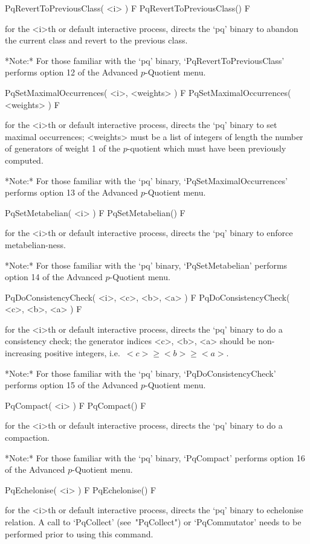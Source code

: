 \>PqRevertToPreviousClass( <i> ) F
\>PqRevertToPreviousClass() F

for the <i>th or default interactive {\ANUPQ} process, directs  the  `pq'
binary to abandon the current class and revert to the previous class.

*Note:*
For  those  familiar  with  the  `pq'  binary,  `PqRevertToPreviousClass'
performs option 12 of the Advanced $p$-Quotient menu.

\>PqSetMaximalOccurrences( <i>, <weights> ) F
\>PqSetMaximalOccurrences( <weights> ) F

for the <i>th or default interactive {\ANUPQ} process, directs  the  `pq'
binary to set maximal occurrences; <weights> must be a list  of  integers
of length the number of generators of weight 1 of the $p$-quotient  which
must have been previously computed.

*Note:* 
For  those  familiar  with  the  `pq'  binary,  `PqSetMaximalOccurrences'
performs option 13 of the Advanced $p$-Quotient menu.

\>PqSetMetabelian( <i> ) F
\>PqSetMetabelian() F

for the <i>th or default interactive {\ANUPQ} process, directs  the  `pq'
binary to enforce metabelian-ness.

*Note:* 
For those familiar  with  the  `pq'  binary,  `PqSetMetabelian'  performs
option 14 of the Advanced $p$-Quotient menu.

\>PqDoConsistencyCheck( <i>, <c>, <b>, <a> ) F
\>PqDoConsistencyCheck( <c>, <b>, <a> ) F

for the <i>th or default interactive {\ANUPQ} process, directs  the  `pq'
binary to do a consistency check; the generator  indices  <c>,  <b>,  <a>
should be non-increasing positive integers, i.e.~$<c> \ge <b> \ge <a>$.

*Note:*
For those familiar with the `pq' binary, `PqDoConsistencyCheck'  performs
option 15 of the Advanced $p$-Quotient menu.

\>PqCompact( <i> ) F
\>PqCompact() F

for the <i>th or default interactive {\ANUPQ} process, directs  the  `pq'
binary to do a compaction.

*Note:*
For those familiar with the `pq' binary, `PqCompact' performs  option  16
of the Advanced $p$-Quotient menu.

\>PqEchelonise( <i> ) F
\>PqEchelonise() F

for the <i>th or default interactive {\ANUPQ} process, directs  the  `pq'
binary to echelonise relation. A call to `PqCollect' (see~"PqCollect") or
`PqCommutator' needs to be performed prior to using this command.

